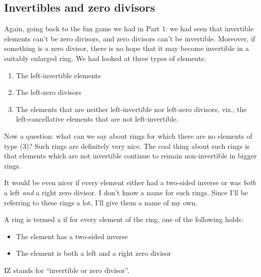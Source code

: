 \documentclass[a4paper]{amsart}
\begin{document}
\subsection{Invertibles and zero divisors}

Again, going back to the fun game we had in Part 1: we had seen that
invertible elements can't be zero divisors, and zero divisors can't be
invertible. Moreover, if something is a zero divisor, there is no hope
that it may become invertible in a suitably enlarged ring. We had
looked at three types of elements:

\begin{enumerate}

\item The left-invertible elements

\item The left-zero divisors

\item The elements that are neither left-invertible nor left-zero
  divisors, viz.,  the left-cancellative elements that are not left-invertible.

\end{enumerate}

Now a question: what can we say about rings for which there are no
elements of type (3)? Such rings are definitely very nice. The cool
thing about such rings is that elements which are not invertible
continue to remain non-invertible in bigger rings.

It would be even nicer if every element either had a two-sided inverse
or was {\em both} a left {\em and} a right zero divisor. I don't know
a name for such rings. Since I'll be referring to these rings a lot,
I'll give them a name of my own.

\begin{definer}[IZ-ring]
  A ring is termed a  if for every element
  of the ring, one of the following holds:

  \begin{itemize}

  \item The element has a two-sided inverse

  \item The element is both a left and a right zero divisor

  \end{itemize}

  IZ stands for ``invertible or zero divisor''.
\end{definer}
\end{document}
